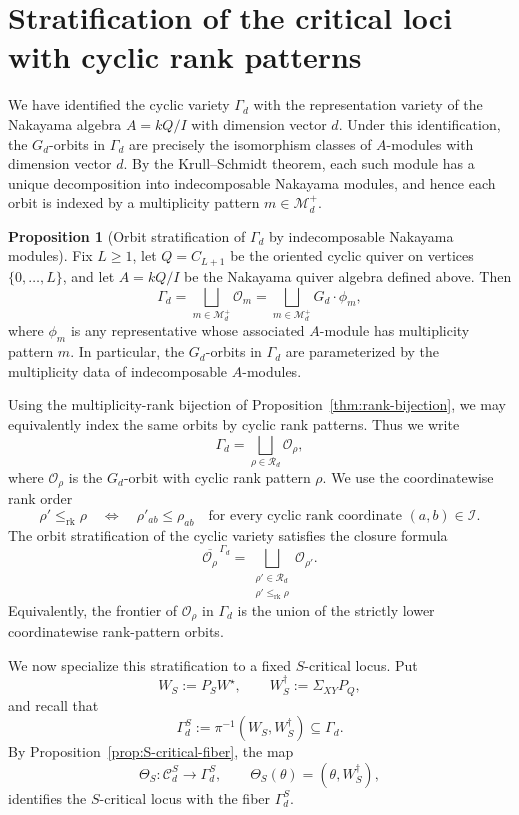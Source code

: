 \documentclass[11pt]{article}
\theoremstyle{definition}
\newtheorem{proposition}[theorem]{Proposition}
\begin{document}
\section{Stratification of the critical loci with cyclic rank patterns}
\label{sec:stratification-critical-loci-rank-patterns}

We have identified the cyclic variety \(\Gamma_d\) with the representation
variety of the Nakayama algebra \(A=kQ/I\) with dimension vector \(d\). Under
this identification, the \(G_d\)-orbits in \(\Gamma_d\) are precisely the
isomorphism classes of \(A\)-modules with dimension vector \(d\). By the
Krull--Schmidt theorem, each such module has a unique decomposition into
indecomposable Nakayama modules, and hence each orbit is indexed by a
multiplicity pattern \(m\in\mathcal M_d^+\).

\begin{proposition}[Orbit stratification of \(\Gamma_d\) by indecomposable Nakayama modules]
\label{prop:Gamma_mult_orbit_stratification}
Fix \(L\geq 1\), let \(Q=C_{L+1}\) be the oriented cyclic quiver on vertices
\(\{0,\dots,L\}\), and let \(A=kQ/I\) be the Nakayama quiver algebra defined
above. Then
\[
\Gamma_d
=
\bigsqcup_{m\in\mathcal M_d^+}\mathcal O_m
=
\bigsqcup_{m\in\mathcal M_d^+}G_d\cdot \phi_m,
\]
where \(\phi_m\) is any representative whose associated \(A\)-module has
multiplicity pattern \(m\). In particular, the \(G_d\)-orbits in \(\Gamma_d\)
are parameterized by the multiplicity data of indecomposable \(A\)-modules.
\end{proposition}

Using the multiplicity-rank bijection of
Proposition~\ref{thm:rank-bijection}, we may equivalently index the same
orbits by cyclic rank patterns. Thus we write
\[
\Gamma_d
=
\bigsqcup_{\rho\in\mathcal R_d}\mathcal O_\rho,
\]
where \(\mathcal O_\rho\) is the \(G_d\)-orbit with cyclic rank pattern
\(\rho\). We use the coordinatewise rank order
\[
\rho'\leq_{\mathrm{rk}}\rho
\quad\Longleftrightarrow\quad
\rho'_{ab}\leq \rho_{ab}
\quad
\text{for every cyclic rank coordinate }(a,b)\in\mathcal I.
\]
The orbit stratification of the cyclic variety satisfies the closure formula
\[
\overline{\mathcal O_\rho}^{\,\Gamma_d}
=
\bigsqcup_{\substack{\rho'\in\mathcal R_d\\
\rho'\leq_{\mathrm{rk}}\rho}}
\mathcal O_{\rho'}.
\]
Equivalently, the frontier of \(\mathcal O_\rho\) in \(\Gamma_d\) is the union
of the strictly lower coordinatewise rank-pattern orbits.

We now specialize this stratification to a fixed \(S\)-critical locus. Put
\[
W_S:=P_S W^\star,
\qquad
W_S^{\dagger}:=\Sigma_{XY}P_Q,
\]
and recall that
\[
\Gamma_d^S
:=
\pi^{-1}(W_S,W_S^{\dagger})
\subseteq \Gamma_d.
\]
By Proposition~\ref{prop:S-critical-fiber}, the map
\[
\Theta_S:\mathcal C_d^S\longrightarrow \Gamma_d^S,
\qquad
\Theta_S(\theta)=(\theta,W_S^{\dagger}),
\]
identifies the \(S\)-critical locus with the fiber \(\Gamma_d^S\).
\end{document}
